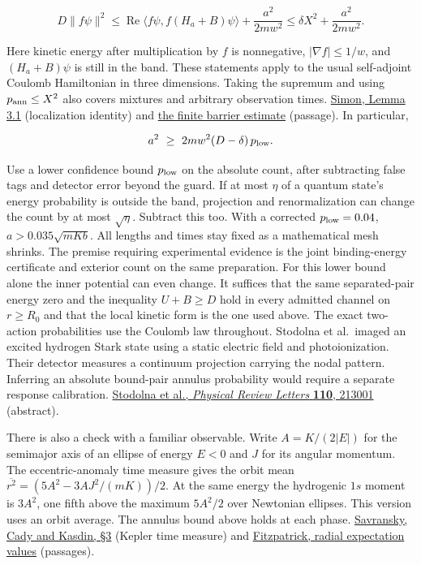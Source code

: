 \documentclass[11pt,a4paper]{article}
\begin{document}
\[
 D\|f\psi\|^2
 \le \operatorname{Re}\langle f\psi,f(H_a+B)\psi\rangle
         +\frac{a^2}{2mw^2}
 \le \delta X^2+\frac{a^2}{2mw^2}.
\]

Here kinetic energy after multiplication by \(f\) is nonnegative,
\(|\nabla f|\le1/w\), and \((H_a+B)\psi\) is still in the band. These
statements apply to the usual self-adjoint Coulomb Hamiltonian in three
dimensions. Taking the supremum and using \(p_{\rm ann}\le X^2\) also
covers mixtures and arbitrary observation times.
\href{https://www.numdam.org/item/AIHPA_1983__38_3_295_0.pdf}{Simon,
Lemma 3.1} (localization identity) and
\href{balaban-newton-time-blocking.md\#a-clock-on-escape-through-a-central-force-barrier}{the
finite barrier estimate} (passage). In particular,

\[
                 a^2\ \ge\ 2m w^2(D-\delta)\,p_{\rm low}.
\]

Use a lower confidence bound \(p_{\rm low}\) on the absolute count,
after subtracting false tags and detector error beyond the guard. If at
most \(\eta\) of a quantum state's energy probability is outside the
band, projection and renormalization can change the count by at most
\(\sqrt\eta\). Subtract this too. With a corrected \(p_{\rm low}=0.04\),
\(a>0.035\sqrt{mKb}\). All lengths and times stay fixed as a
mathematical mesh shrinks. The premise requiring experimental evidence
is the joint binding-energy certificate and exterior count on the same
preparation. For this lower bound alone the inner potential can even
change. It suffices that the same separated-pair energy zero and the
inequality \(U+B\ge D\) hold in every admitted channel on \(r\ge R_0\)
and that the local kinetic form is the one used above. The exact
two-action probabilities use the Coulomb law throughout. Stodolna et
al.~imaged an excited hydrogen Stark state using a static electric field
and photoionization. Their detector measures a continuum projection
carrying the nodal pattern. Inferring an absolute bound-pair annulus
probability would require a separate response calibration.
\href{https://doi.org/10.1103/PhysRevLett.110.213001}{Stodolna et al.,
\emph{Physical Review Letters} \textbf{110}, 213001} (abstract).

There is also a check with a familiar observable. Write \(A=K/(2|E|)\)
for the semimajor axis of an ellipse of energy \(E<0\) and \(J\) for its
angular momentum. The eccentric-anomaly time measure gives the orbit
mean \(\overline{r^2}=(5A^2-3AJ^2/(mK))/2\). At the same energy the
hydrogenic \(1s\) moment is \(3A^2\), one fifth above the maximum
\(5A^2/2\) over Newtonian ellipses. This version uses an orbit average.
The annulus bound above holds at each phase.
\href{https://arxiv.org/pdf/1012.1526}{Savransky, Cady and Kasdin, §3}
(Kepler time measure) and
\href{https://phys.libretexts.org/Bookshelves/Quantum_Mechanics/Introductory_Quantum_Mechanics_\%28Fitzpatrick\%29/08\%3A_Central_Potentials/8.03\%3A_Hydrogen_Atom}{Fitzpatrick,
radial expectation values} (passages).
\end{document}
